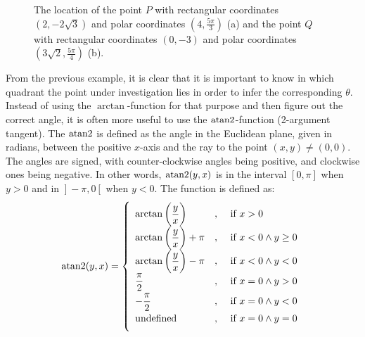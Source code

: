 \begin{figure}
\centering
\centerline{
\hspace{1cm}
}
\caption{The location of the point $P$ with rectangular coordinates $\left(2,-2\sqrt{3}\right)$ and polar coordinates $\left(4,\frac{5\pi}{3}\right)$ (a) and the point $Q$ with rectangular coordinates $\left(0,-3\right)$ and polar coordinates $\left(3\sqrt{2},\frac{5\pi}{4}\right)$ (b). }

\end{figure}


From the previous example, it is clear that it is important to know in which quadrant the point under investigation lies in order to infer the corresponding $\theta$. Instead of using the $\arctan$-function for that purpose and then figure out the correct angle, it is often more useful to use the $\atan2$-function (2-argument tangent). The $\atan2$ is defined as the angle in the Euclidean plane, given in radians, between the positive $x$-axis and the ray to the point $(x,y)\neq(0,0)$. The angles are signed, with counter-clockwise angles being positive, and clockwise ones being negative. In other words, $\atan2(y,x)$ is in the interval $[0,\pi]$ when $y>0$ and in $\left.\right]-\pi, 0\left[\right.$ when $y<0$.    The function is defined as:
\begin{equation}
\atan2(y,x)=\left\{
\begin{array}{lcl}
\arctan\left(\dfrac{y}{x}\right)&,&\text{ if }x>0\\[0.2cm]
\arctan\left(\dfrac{y}{x}\right)+\pi&,&\text{ if }x<0\wedge y\geq0\\[0.2cm]
\arctan\left(\dfrac{y}{x}\right)-\pi&,&\text{ if }x<0\wedge y<0\\[0.2cm]
\dfrac{\pi}{2}&,&\text{ if }x=0\wedge y>0\\[0.2cm]
-\dfrac{\pi}{2}&,&\text{ if }x=0\wedge y<0\\[0.2cm]
\text{undefined}&,&\text{ if }x=0\wedge y=0\\[0.2cm]
\end{array}
\right.
\end{equation}


